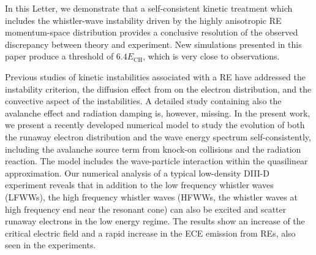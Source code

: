 \documentclass[aps, prl, preprint,english,superscriptaddress]{revtex4-1}
\begin{document}

In this Letter, we demonstrate that a self-consistent kinetic treatment which includes the whistler-wave instability driven by the highly anisotropic RE momentum-space distribution %
provides a conclusive resolution of the observed discrepancy between theory and experiment. New simulations presented in this paper produce a threshold of $6.4 E_\mathrm{CH}$, which is very close to observations. 

Previous studies of kinetic instabilities associated with a RE\cite{parail_kinetic_1978} have addressed the instability criterion\cite{fulop_destabilization_2006}, the diffusion effect from on the electron distribution\cite{pokol_quasi-linear_2008,komar_interaction_2012,pokol_quasi-linear_2014,komar_electromagnetic_2013}, and the convective aspect of the instabilities\cite{aleynikov_stability_2015}. A detailed study containing also the avalanche effect and radiation damping is, however, missing. In the present work, we present a recently developed numerical model to study the evolution of both the runaway electron distribution and the wave energy spectrum self-consistently, including the avalanche source term from knock-on collisions and the radiation reaction. The model includes the wave-particle interaction within the quasilinear approximation. 
Our numerical analysis of a typical low-density DIII-D experiment reveals that in addition to  the low frequency whistler waves (LFWWs), the high frequency whistler waves (HFWWs, the whistler waves at high frequency end near the resonant cone) can also be excited and scatter runaway electrons in the low energy regime.
The results show an increase of the critical electric field and a rapid increase in the ECE emission from REs, also seen in the experiments.
\end{document}
